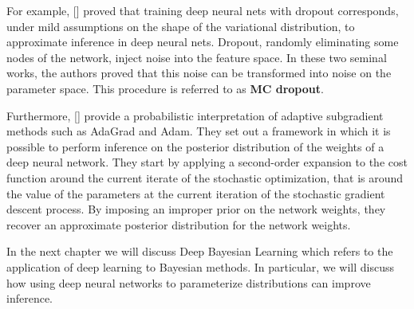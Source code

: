 For example, [\cite{Gal2015, Gal2016}] proved that training deep neural nets with dropout corresponds, under mild assumptions on the shape of the variational distribution, to approximate inference in deep neural nets. Dropout, randomly eliminating some nodes of the network, inject noise into the feature space. In these two seminal works, the authors proved that this noise can be transformed into noise on the parameter space. This procedure is referred to as \textbf{MC dropout}.

Furthermore, [\cite{Salas2018}] provide a probabilistic interpretation of adaptive subgradient methods such as AdaGrad and Adam. They set out a framework in which it is possible to perform inference on the posterior distribution of the weights of a deep neural network. They start by applying a second-order expansion to the cost function around the current iterate of the stochastic optimization, that is around the value of the parameters at the current iteration of the stochastic gradient descent process. By imposing an improper prior on the network weights, they recover an approximate posterior distribution for the network weights.

In the next chapter we will discuss Deep Bayesian Learning which refers to the application of deep learning to Bayesian methods. In particular, we will discuss how using deep neural networks to parameterize distributions can improve inference.





\vspace{4cm}